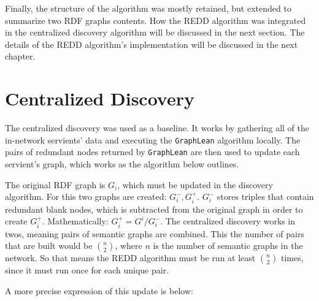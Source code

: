 
\vspace{1cm}

Finally, the structure of the algorithm was mostly retained, but extended to summarize two RDF graphs contents. How the REDD algorithm was integrated in the centralized discovery algorithm will be discussed in the next section. The details of the REDD algorithm's implementation will be discussed in the next chapter.



\section{Centralized Discovery}
The centralized discovery was used as a baseline. It works by gathering all of the in-network servients' data and executing the \texttt{GraphLean} algorithm locally. The pairs of redundant nodes returned by \texttt{GraphLean} are then used to update each servient's graph, which works as the algorithm below outlines.

The original RDF graph is $G_{i}$, which must be updated in the discovery algorithm. For this two graphs are created: $G^{-}_{i}, G^{+}_{i}$. $G^{-}_{i}$ stores triples that contain redundant blank nodes, which is subtracted from the original graph in order to create $G^{+}_{i}$. Mathematically: $G^{+}_{i} = G^{i}/G^{-}_{i}$. The centralized discovery works in twos, meaning pairs of semantic graphs are combined. This the number of pairs that are built would be ${n \choose 2}$, where $n$ is the number of semantic graphs in the network. So that means the REDD algorithm must be run at least ${n \choose 2}$ times, since it must run once for each unique pair.

A more precise expression of this update is below:



